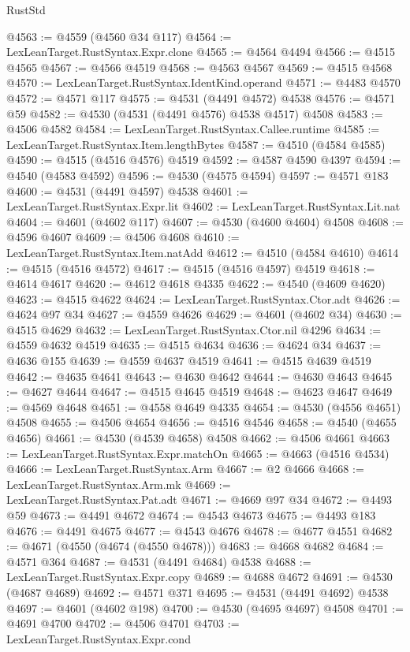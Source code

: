 \begin{lexlean}{RustStd}
\begin{coremodule}
@4563 := @4559 (@4560 @34 @117)
@4564 := LexLeanTarget.RustSyntax.Expr.clone
@4565 := @4564 @4494
@4566 := @4515 @4565
@4567 := @4566 @4519
@4568 := @4563 @4567
@4569 := @4515 @4568
@4570 := LexLeanTarget.RustSyntax.IdentKind.operand
@4571 := @4483 @4570
@4572 := @4571 @117
@4575 := @4531 (@4491 @4572) @4538
@4576 := @4571 @59
@4582 := @4530 (@4531 (@4491 @4576) @4538 @4517) @4508
@4583 := @4506 @4582
@4584 := LexLeanTarget.RustSyntax.Callee.runtime
@4585 := LexLeanTarget.RustSyntax.Item.lengthBytes
@4587 := @4510 (@4584 @4585)
@4590 := @4515 (@4516 @4576) @4519
@4592 := @4587 @4590 @4397
@4594 := @4540 (@4583 @4592)
@4596 := @4530 (@4575 @4594)
@4597 := @4571 @183
@4600 := @4531 (@4491 @4597) @4538
@4601 := LexLeanTarget.RustSyntax.Expr.lit
@4602 := LexLeanTarget.RustSyntax.Lit.nat
@4604 := @4601 (@4602 @117)
@4607 := @4530 (@4600 @4604) @4508
@4608 := @4596 @4607
@4609 := @4506 @4608
@4610 := LexLeanTarget.RustSyntax.Item.natAdd
@4612 := @4510 (@4584 @4610)
@4614 := @4515 (@4516 @4572)
@4617 := @4515 (@4516 @4597) @4519
@4618 := @4614 @4617
@4620 := @4612 @4618 @4335
@4622 := @4540 (@4609 @4620)
@4623 := @4515 @4622
@4624 := LexLeanTarget.RustSyntax.Ctor.adt
@4626 := @4624 @97 @34
@4627 := @4559 @4626
@4629 := @4601 (@4602 @34)
@4630 := @4515 @4629
@4632 := LexLeanTarget.RustSyntax.Ctor.nil @4296
@4634 := @4559 @4632 @4519
@4635 := @4515 @4634
@4636 := @4624 @34
@4637 := @4636 @155
@4639 := @4559 @4637 @4519
@4641 := @4515 @4639 @4519
@4642 := @4635 @4641
@4643 := @4630 @4642
@4644 := @4630 @4643
@4645 := @4627 @4644
@4647 := @4515 @4645 @4519
@4648 := @4623 @4647
@4649 := @4569 @4648
@4651 := @4558 @4649 @4335
@4654 := @4530 (@4556 @4651) @4508
@4655 := @4506 @4654
@4656 := @4516 @4546
@4658 := @4540 (@4655 @4656)
@4661 := @4530 (@4539 @4658) @4508
@4662 := @4506 @4661
@4663 := LexLeanTarget.RustSyntax.Expr.matchOn
@4665 := @4663 (@4516 @4534)
@4666 := LexLeanTarget.RustSyntax.Arm
@4667 := @2 @4666
@4668 := LexLeanTarget.RustSyntax.Arm.mk
@4669 := LexLeanTarget.RustSyntax.Pat.adt
@4671 := @4669 @97 @34
@4672 := @4493 @59
@4673 := @4491 @4672
@4674 := @4543 @4673
@4675 := @4493 @183
@4676 := @4491 @4675
@4677 := @4543 @4676
@4678 := @4677 @4551
@4682 := @4671 (@4550 (@4674 (@4550 @4678)))
@4683 := @4668 @4682
@4684 := @4571 @364
@4687 := @4531 (@4491 @4684) @4538
@4688 := LexLeanTarget.RustSyntax.Expr.copy
@4689 := @4688 @4672
@4691 := @4530 (@4687 @4689)
@4692 := @4571 @371
@4695 := @4531 (@4491 @4692) @4538
@4697 := @4601 (@4602 @198)
@4700 := @4530 (@4695 @4697) @4508
@4701 := @4691 @4700
@4702 := @4506 @4701
@4703 := LexLeanTarget.RustSyntax.Expr.cond

\end{coremodule}
\end{lexlean}
